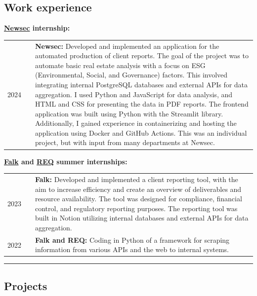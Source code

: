 \documentclass[10pt]{article}
\newlength{\cw}
\newlength{\cwl}
\begin{document}
\subsection*{Work experience}
 
\textbf{\href{https://www.newsec.no/}{Newsec} internship:}

\begin{tabular}{p{\cw} @{:}l p{\cwl}}
  2024 & & \textbf{Newsec:} Developed and implemented an application for the automated production of client reports.
  The goal of the project was to automate basic real estate analysis with a focus on ESG (Environmental, Social, and Governance) factors.
  This involved integrating internal PostgreSQL databases and external APIs for data aggregation.
  I used Python and JavaScript for data analysis, and HTML and CSS for presenting the data in PDF reports.
  The frontend application was built using Python with the Streamlit library.
  Additionally, I gained experience in containerizing and hosting the application using Docker and GitHub Actions.
  This was an individual project, but with input from many departments at Newsec.
  \\
\end{tabular}

\textbf{\href{https://www.falkglobal.no/}{Falk} and \href{https://req.no/}{REQ} summer internships:}

\begin{tabular}{p{\cw} @{:}l p{\cwl}}
  2023 & & \textbf{Falk:} Developed and implemented a client reporting tool, with the aim to increase efficiency and create an overview of deliverables and resource availability.
  The tool was designed for compliance, financial control, and regulatory reporting purposes. The reporting tool was built in Notion utilizing internal databases and external APIs for data aggregation.\\
  2022 & & \textbf{Falk and REQ:} Coding in Python of a framework for scraping information from various APIs and the web to internal systems.
\end{tabular}

\vspace{0.1cm}
\hrule
\vspace{0.1cm}

\subsection*{Projects}
\end{document}
